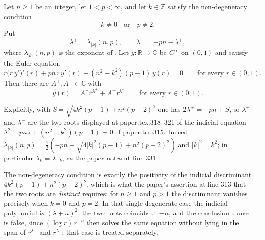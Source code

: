 \begin{lemma}
Let $n\ge1$ be an integer, let $1<p<\infty$, and let $k\in\mathbb{Z}$ satisfy
the non-degeneracy condition
\[
  k\neq0\quad\text{or}\quad p\neq2 .
\]
Put
\[
  \lambda^{+}=\lambda_{|k|}(n,p),\qquad \lambda^{-}=-pn-\lambda^{+},
\]
where $\lambda_{|k|}(n,p)$ is the exponent of .  Let
$y\colon\mathbb{R}\to\mathbb{C}$ be $C^\infty$ on $(0,1)$ and satisfy the Euler
equation
\[
  r\bigl(r\,y'\bigr)'(r)+pn\,r\,y'(r)+(n^2-k^2)(p-1)\,y(r)=0
  \qquad\text{for every }r\in(0,1).
\]
Then there are $A^{+},A^{-}\in\mathbb{C}$ with
\[
  y(r)=A^{+}r^{\lambda^{+}}+A^{-}r^{\lambda^{-}}\qquad\text{for every }r\in(0,1).
\]

Explicitly, with $S=\sqrt{4k^2(p-1)+n^2(p-2)^2}$ one has $2\lambda^{\pm}=-pn\pm S$,
so $\lambda^{+}$ and $\lambda^{-}$ are the two roots displayed at
paper.tex:318--321 of the indicial equation
$\lambda^2+pn\lambda+(n^2-k^2)(p-1)=0$ of paper.tex:315.  Indeed
$\lambda_{|k|}(n,p)=\frac12(-pn+\sqrt{4|k|^2(p-1)+n^2(p-2)^2})$ and $|k|^2=k^2$;
in particular $\lambda_k=\lambda_{-k}$, as the paper notes at line 331.

The non-degeneracy condition is exactly the positivity of the indicial
discriminant $4k^2(p-1)+n^2(p-2)^2$, which is what the paper's assertion at line
313 that the two roots are \emph{distinct} requires: for $n\ge1$ and $p>1$ the
discriminant vanishes precisely when $k=0$ and $p=2$.  In that single degenerate
case the indicial polynomial is $(\lambda+n)^2$, the two roots coincide at $-n$,
and the conclusion above is false, since $(\log r)\,r^{-n}$ then solves the same
equation without lying in the span of $r^{\lambda^{+}}$ and $r^{\lambda^{-}}$;
that case is treated separately.
\end{lemma}
